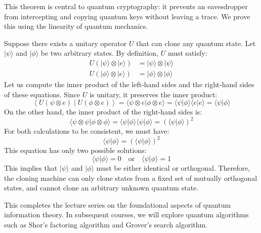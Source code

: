 This theorem is central to quantum cryptography: it prevents an eavesdropper from intercepting and copying quantum keys without leaving a trace. We prove this using the linearity of quantum mechanics.

\begin{proofbox}
Suppose there exists a unitary operator \(U\) that can clone any quantum state. Let \(|\psi\rangle\) and \(|\phi\rangle\) be two arbitrary states. By definition, \(U\) must satisfy:
\begin{align}
U \left( |\psi\rangle \otimes |e\rangle \right) &= |\psi\rangle \otimes |\psi\rangle \label{eq:clone1} \\
U \left( |\phi\rangle \otimes |e\rangle \right) &= |\phi\rangle \otimes |\phi\rangle \label{eq:clone2}
\end{align}
Let us compute the inner product of the left-hand sides and the right-hand sides of these equations.
Since \(U\) is unitary, it preserves the inner product:
\[
\left\langle U (\psi \otimes e) \middle| U (\phi \otimes e) \right\rangle = \langle\psi \otimes e | \phi \otimes e\rangle = \langle\psi|\phi\rangle \langle e|e\rangle = \langle\psi|\phi\rangle
\]
On the other hand, the inner product of the right-hand sides is:
\[
\langle\psi \otimes \psi | \phi \otimes \phi\rangle = \langle\psi|\phi\rangle \langle\psi|\phi\rangle = \left( \langle\psi|\phi\rangle \right)^2
\]
For both calculations to be consistent, we must have:
\[
\langle\psi|\phi\rangle = \left( \langle\psi|\phi\rangle \right)^2
\]
This equation has only two possible solutions:
\[
\langle\psi|\phi\rangle = 0 \quad \text{or} \quad \langle\psi|\phi\rangle = 1
\]
This implies that \(|\psi\rangle\) and \(|\phi\rangle\) must be either identical or orthogonal.
Therefore, the cloning machine can only clone states from a fixed set of mutually orthogonal states, and cannot clone an arbitrary unknown quantum state.
\end{proofbox}

This completes the lecture series on the foundational aspects of quantum information theory. In subsequent courses, we will explore quantum algorithms such as Shor's factoring algorithm and Grover's search algorithm.
